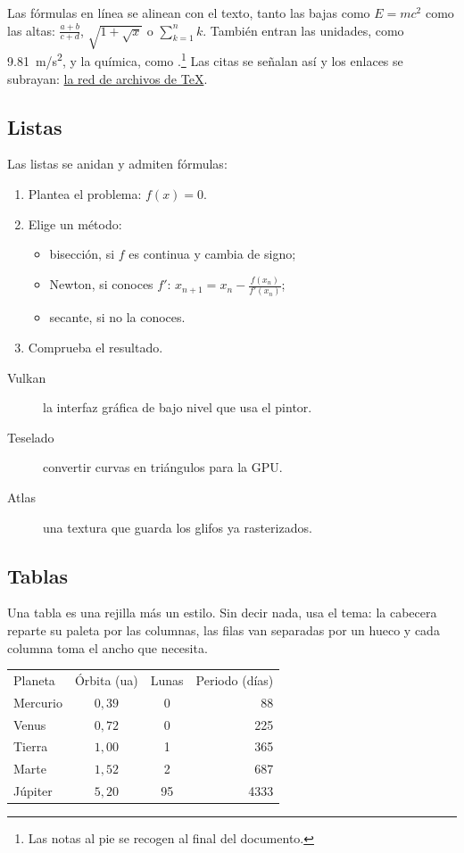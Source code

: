 Las fórmulas en línea se alinean con el texto, tanto las bajas como $E=mc^2$ como las altas: $\frac{a+b}{c+d}$, $\sqrt{1+\sqrt{x}}$ o $\sum_{k=1}^{n}k$. También entran las unidades, como \SI{9.81}{m/s^2}, y la química, como .\footnote{Las notas al pie se recogen al final del documento.} Las citas se señalan así \cite{knuth} y los enlaces se subrayan: \href{https://ctan.org}{la red de archivos de TeX}.

\subsection{Listas}

Las listas se anidan y admiten fórmulas:

\begin{enumerate}
\item Plantea el problema: $f(x)=0$.
\item Elige un método:
  \begin{itemize}
  \item bisección, si $f$ es continua y cambia de signo;
  \item Newton, si conoces $f'$: $x_{n+1}=x_n-\frac{f(x_n)}{f'(x_n)}$;
  \item secante, si no la conoces.
  \end{itemize}
\item Comprueba el resultado.
\end{enumerate}

\begin{description}
\item[Vulkan] la interfaz gráfica de bajo nivel que usa el pintor.
\item[Teselado] convertir curvas en triángulos para la GPU.
\item[Atlas] una textura que guarda los glifos ya rasterizados.
\end{description}

\subsection{Tablas}

Una tabla es una rejilla más un estilo. Sin decir nada, usa el tema: la cabecera reparte su paleta por las columnas, las filas van separadas por un hueco y cada columna toma el ancho que necesita.

\begin{tabular}{lccr}
Planeta & Órbita (ua) & Lunas & Periodo (días) \\
Mercurio & $0{,}39$ & 0 & 88 \\
Venus & $0{,}72$ & 0 & 225 \\
Tierra & $1{,}00$ & 1 & 365 \\
Marte & $1{,}52$ & 2 & 687 \\
Júpiter & $5{,}20$ & 95 & 4333 \\
\end{tabular}

